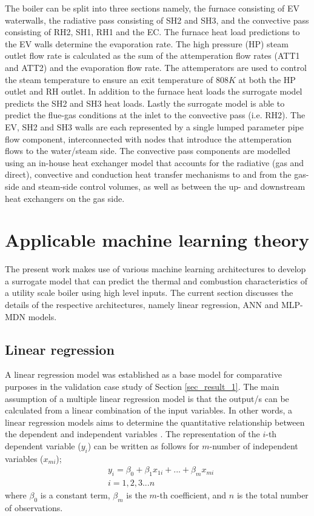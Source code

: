 \documentclass[a4paper,fleqn]{cas-dc}
\begin{document}
The boiler can be split into three sections namely, the furnace consisting of EV waterwalls, the radiative pass consisting of SH2 and SH3, and the convective pass consisting of RH2, SH1, RH1 and the EC. The furnace heat load predictions to the EV walls determine the evaporation rate. The high pressure (HP) steam outlet flow rate is calculated as the sum of the attemperation flow rates (ATT1 and ATT2) and the evaporation flow rate. The attemperators are used to control the steam temperature to ensure an exit temperature of $808K$ at both the HP outlet and RH outlet. In addition to the furnace heat loads the surrogate model predicts the SH2 and SH3 heat loads. Lastly the surrogate model is able to predict the flue-gas conditions at the inlet to the convective pass (i.e. RH2). The EV, SH2 and SH3 walls are each represented by a single lumped parameter pipe flow component, interconnected with nodes that introduce the attemperation flows to the water/steam side. The convective pass components are modelled using an in-house heat exchanger model that accounts for the radiative (gas and direct), convective and conduction heat transfer mechanisms to and from the gas-side and steam-side control volumes, as well as between the up- and downstream heat exchangers on the gas side.

\section{Applicable machine learning theory}
The present work makes use of various machine learning architectures to develop a surrogate model that can predict the thermal and combustion characteristics of a utility scale boiler using high level inputs. The current section discusses the details of the respective architectures, namely linear regression, ANN and MLP-MDN models.  
\subsection{Linear regression}
A linear regression model was established as a base model for comparative purposes in the validation case study of Section \ref{sec_result_1}. The main assumption of a multiple linear regression model is that the output/s can be calculated from a linear combination of the input variables. In other words, a linear regression models aims to determine the quantitative relationship between the dependent and independent variables \cite{Wen2022}. The representation of the $i$-th dependent variable ($y_i$) can be written as follows for $m$-number of independent variables ($x_{mi}$);
\begin{equation}
\begin{split}
&y_i = \beta_0+\beta_1 x_{1i}+...+\beta_m x_{mi}\\
&i = 1,2,3...n
\end{split}
\end{equation}
where $\beta_0$ is a constant term, $\beta_{m}$ is the $m$-th coefficient, and $n$ is the total number of observations.\\
 
\end{document}
